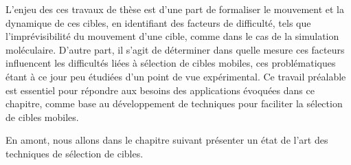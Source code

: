 	
	L'enjeu des ces travaux de thèse est d'une part de formaliser le mouvement et la dynamique de ces cibles, en identifiant des facteurs de difficulté, tels que l'imprévisibilité du mouvement d'une cible, comme dans le cas de la simulation moléculaire. D'autre part, il s'agit de déterminer dans quelle mesure ces facteurs influencent les difficultés liées à sélection de cibles mobiles, ces problématiques étant à ce jour peu étudiées d'un point de vue expérimental. Ce travail préalable est essentiel pour répondre aux besoins des applications évoquées dans ce chapitre, comme base au développement de techniques pour faciliter la sélection de cibles mobiles.
	
	En amont, nous allons dans le chapitre suivant présenter un état de l'art des techniques de sélection de cibles.